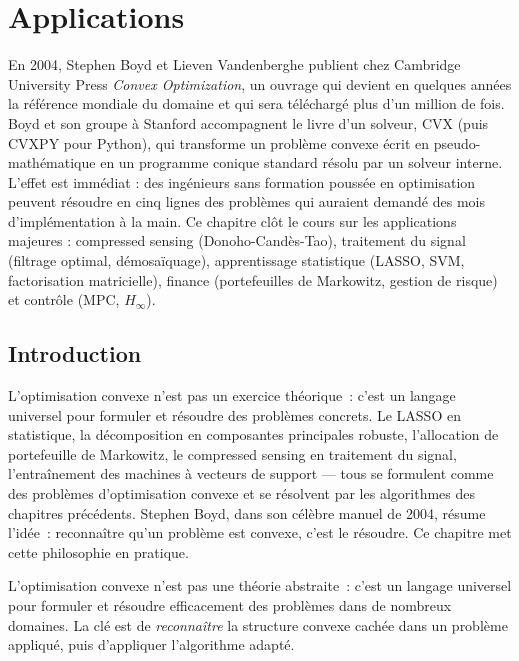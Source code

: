 \chapter{Applications}
\label{ch:applications}

En 2004, Stephen Boyd et Lieven Vandenberghe publient chez Cambridge University Press \emph{Convex Optimization}, un ouvrage qui devient en quelques années la référence mondiale du domaine et qui sera téléchargé plus d'un million de fois. Boyd et son groupe à Stanford accompagnent le livre d'un solveur, CVX (puis CVXPY pour Python), qui transforme un problème convexe écrit en pseudo-mathématique en un programme conique standard résolu par un solveur interne. L'effet est immédiat : des ingénieurs sans formation poussée en optimisation peuvent résoudre en cinq lignes des problèmes qui auraient demandé des mois d'implémentation à la main. Ce chapitre clôt le cours sur les applications majeures : compressed sensing (Donoho-Candès-Tao), traitement du signal (filtrage optimal, démosaïquage), apprentissage statistique (LASSO, SVM, factorisation matricielle), finance (portefeuilles de Markowitz, gestion de risque) et contrôle (MPC, $H_{\infty}$).

\section{Introduction}

L'optimisation convexe n'est pas un exercice th\'eorique~: c'est un langage universel pour formuler et r\'esoudre des probl\`emes concrets. Le LASSO en statistique, la d\'ecomposition en composantes principales robuste, l'allocation de portefeuille de Markowitz, le compressed sensing en traitement du signal, l'entra\^inement des machines \`a vecteurs de support --- tous se formulent comme des probl\`emes d'optimisation convexe et se r\'esolvent par les algorithmes des chapitres pr\'ec\'edents. Stephen Boyd, dans son c\'el\`ebre manuel de 2004, r\'esume l'id\'ee~: \og reconnaître qu'un probl\`eme est convexe, c'est le r\'esoudre. \fg{} Ce chapitre met cette philosophie en pratique.

\begin{intuition}
L'optimisation convexe n'est pas une th\'eorie abstraite~: c'est un langage
universel pour formuler et r\'esoudre efficacement des probl\`emes dans de
nombreux domaines. La cl\'e est de \emph{reconna\^itre} la structure convexe
cach\'ee dans un probl\`eme appliqu\'e, puis d'appliquer l'algorithme
adapt\'e.
\end{intuition}

